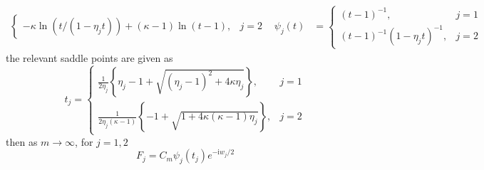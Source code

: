 \documentclass[twoside]{article}
\begin{document}
\begin{itemize}
\begin{itemize}
\begin{itemize}
\begin{align*}
\begin{cases}
                    -\kappa \ln(t/(1-\eta_jt))+(\kappa-1)\ln(t-1), &j=2
                \end{cases} & \psi_j(t) &=\begin{cases}
                    (t-1)^{-1},&j=1\\
                    (t-1)^{-1}(1-\eta_jt)^{-1}, &j=2
                \end{cases}
            \end{align*}
            the relevant saddle points are given as
            \begin{equation*}
                t_j = \begin{cases}
                    \frac{1}{2\eta_j}\left\{ \eta_j-1 + \sqrt{(\eta_j-1)^2+4\kappa\eta_j} \right\}, &j=1\\
                    \frac{1}{2\eta_j(\kappa-1)}\left\{ -1 + \sqrt{1+4\kappa(\kappa-1)\eta_j} \right\}, &j=2
                \end{cases}
            \end{equation*}
            then as $m\rightarrow \infty$, for $j=1,2$
            $$
            F_j = C_m \psi_j(t_j)e^{-\mathrm{i}w_j/2}
            $$
        \end{itemize}
    \end{itemize}
\end{itemize}

\newpage


\end{document}
